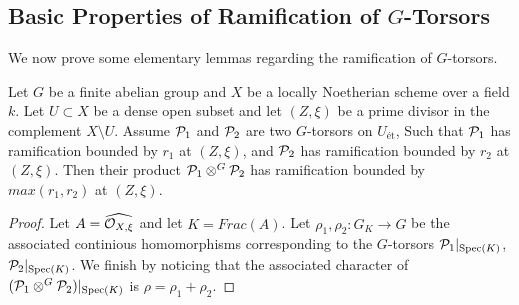 \subsection*{Basic Properties of Ramification of \texorpdfstring{$G$-Torsors}{G-Torsors}}
We now prove some elementary lemmas regarding the ramification of $G$-torsors.
\begin{lemma}\label{lemma:bounding_ramification_of_contracted_product:reorg}
    Let $G$ be a finite abelian group and $X$ be a locally Noetherian scheme over a field $k$. 
    Let $U \subset X$ be a dense open subset and let $(Z, \xi)$ be a prime divisor in the complement $X \setminus U$.
    Assume $\mathcal{P}_1$ and $\mathcal{P}_2$ are two $G$-torsors on $U_{\text{ét}}$, Such that $\mathcal{P}_1$ has ramification bounded by $r_1$ at $(Z, \xi)$, and $\mathcal{P}_2$ has ramification bounded by $r_2$ at $(Z, \xi)$.
    Then their product $\mathcal{P}_1 \otimes^G \mathcal{P}_2$ has ramification bounded by $max(r_1, r_2)$ at $(Z, \xi)$.
\end{lemma}
\begin{proof}
    Let $A=\widehat{\mathcal{O}_{X, \xi}}$ and let $K=Frac(A)$.
    Let $\rho_1, \rho_2: G_K \to G$ be the associated continious homomorphisms corresponding to the $G$-torsors 
    $\mathcal{P}_1|_{\operatorname{Spec}(K)}$, $\mathcal{P}_2|_{\operatorname{Spec}(K)}$.
    We finish by noticing that the associated character of $(\mathcal{P}_1 \otimes^G \mathcal{P}_2)|_{\operatorname{Spec}(K)}$ is $\rho=\rho_1 + \rho_2$.    
\end{proof}

